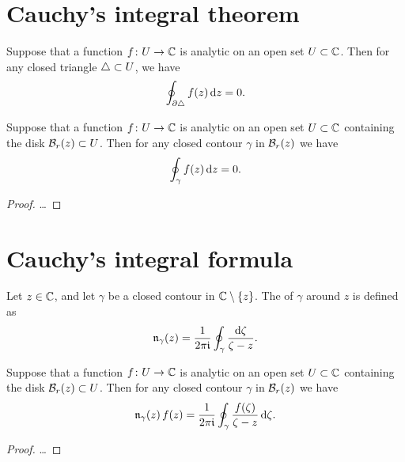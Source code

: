 \section{Cauchy's integral theorem}

\begin{lemma}
  \label{lem:goursat}
  Suppose that a function $f \colon U \to \mathbb{C}$ is analytic on an open
  set $U \subset \mathbb{C}$.
  Then for any closed triangle $\triangle \subset U$, we have
  \begin{align*}
    \oint_{\partial \triangle} f(z) \, \mathrm{d} z = 0 .
  \end{align*}
\end{lemma}

\begin{theorem}
  \label{thm:cauchy_theorem}
  Suppose that a function $f \colon U \to \mathbb{C}$ is analytic on an open
  set $U \subset \mathbb{C}$ containing the disk $\mathcal{B}_{{r}}(z) \subset U$.
  Then for any closed contour $\gamma$ in $\mathcal{B}_{{r}}(z)$ we have
  \begin{align*}
    \oint_\gamma f(z) \, \mathrm{d} z = 0 .
  \end{align*}
\end{theorem}
\begin{proof}
  \ldots
\end{proof}



\section{Cauchy's integral formula}

\begin{definition}
  \label{def:winding_number}
  Let $z \in \mathbb{C}$, and let $\gamma$ be a closed contour
  in $\mathbb{C} \setminus \left\{ z \right\}$.
  The  of $\gamma$ around $z$ is defined as
  \begin{align*}
    \mathfrak{n}_{{\gamma}}(z) = \frac{1}{2\pi \mathfrak{i}} \oint_\gamma \frac{\mathrm{d} \zeta}{\zeta - z} .
  \end{align*}
\end{definition}

\begin{theorem}
  \label{thm:CAUCHY_FORMULA}
  Suppose that a function $f \colon U \to \mathbb{C}$ is analytic on an open
  set $U \subset \mathbb{C}$ containing the disk $\mathcal{B}_{{r}}(z) \subset U$.
  Then for any closed contour $\gamma$ in $\mathcal{B}_{{r}}(z)$ we have
  \begin{align*}
    \mathfrak{n}_{{\gamma}}(z) \, f(z)
      = \frac{1}{2\pi \mathfrak{i}} \oint_\gamma \frac{f(\zeta)}{\zeta - z} \, \mathrm{d} \zeta .
  \end{align*}
\end{theorem}
\begin{proof}
  \ldots
\end{proof}
